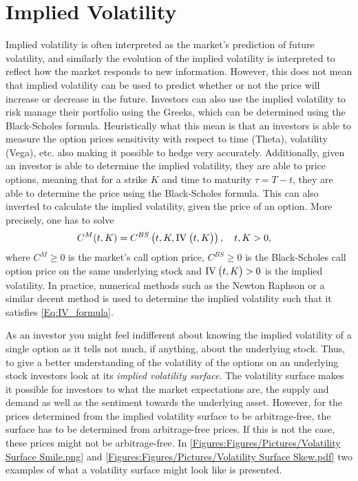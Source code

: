 \section{Implied Volatility}\label{Sec.Implied_Volatility}
Implied volatility is often interpreted as the market's prediction of future volatility, and similarly the evolution of the implied volatility is interpreted to reflect how the market responds to new information. However, this does not mean that implied volatility can be used to predict whether or not the price will increase or decrease in the future. Investors can also use the implied volatility to risk manage their portfolio using the Greeks, which can be determined using the Black-Scholes formula. Heuristically what this mean is that an investors is able to measure the option prices sensitivity with respect to time (Theta), volatility (Vega), etc. also making it possible to hedge very accurately. Additionally, given an investor is able to determine the implied volatility, they are able to price options, meaning that for a strike $K$ and time to maturity $\tau=T-t$, they are able to determine the price using the Black-Scholes formula. This can also inverted to calculate the implied volatility, given the price of an option. More precisely, one has to solve
\begin{align}\label{Eq:IV_formula}
    C^{M}(t,K) &= C^{BS}\left(t,K,\IV{t,K}\right),\quad t,K>0,
\end{align}
where $C^{M}\geq0$ is the market's call option price, $C^{BS}\geq0$ is the Black-Scholes call option price on the same underlying stock and $\IV{t,K}>0$ is the implied volatility. In practice, numerical methods such as the Newton Raphson or a similar decent method is used to determine the implied volatility such that it satisfies \eqref{Eq:IV_formula}.

As an investor you might feel indifferent about knowing the implied volatility of a single option as it tells not much, if anything, about the underlying stock. Thus, to give a better understanding of the volatility of the options on an underlying stock investors look at its \emph{implied volatility surface}. The volatility surface makes it possible for investors to what the market expectations are, the supply and demand as well as the sentiment towards the underlying asset. However, for the prices determined from the implied volatility surface to be arbitrage-free, the surface has to be determined from arbitrage-free prices. If this is not the case, these prices might not be arbitrage-free. In \autoref{Figures:Figures/Pictures/Volatility Surface Smile.png} and \autoref{Figures:Figures/Pictures/Volatility Surface Skew.pdf} two examples of what a volatility surface might look like is presented. 


